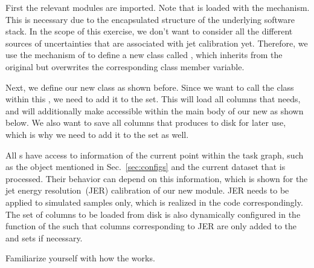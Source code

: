 First the relevant modules are imported.
Note that  is loaded with the  mechanism.
This is necessary due to the encapsulated structure of the underlying software stack.
In the scope of this exercise, we don't want to consider all the different sources of uncertainties that are associated with jet calibration yet.
Therefore, we use the  mechanism of  to define a new class called , which inherits from the original   but overwrites the corresponding class member variable.

Next, we define our new  class  as shown before.
Since we want to call the  class within this , we need to add it to the  set.
This will load all columns that  needs, and will additionally make  accessible within the main body of our new  as shown below.
We also want to save all columns that  produces to disk for later use, which is why we need to add it to the  set as well.

All s have access to information of the current point within the task graph, such as the  object mentioned in Sec.~\ref{sec:configs} and the current dataset that is processed.
Their behavior can depend on this information, which is shown for the jet energy resolution~(JER) calibration of our new  module.
JER needs to be applied to simulated samples only, which is realized in the code correspondingly.
The set of columns to be loaded from disk is also dynamically configured in the  function of the   such that columns corresponding to JER are only added to the  and  sets if necessary.

\begin{exercise}
	Familiarize yourself with how the  works.
\end{exercise}